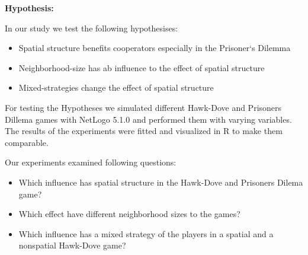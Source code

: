 \textbf{Hypothesis:}

In our study we test the following hypothesises: 

\begin{itemize}
\item Spatial structure benefits cooperators especially in the Prisoner`s Dilemma 
\item Neighborhood-size has ab influence to the effect of spatial structure
\item Mixed-strategies change the effect of spatial structure
\end{itemize}

For testing the Hypotheses we simulated different Hawk-Dove and Prisoners Dillema games with NetLogo 5.1.0 and performed them with varying variables. The results of the experiments were fitted and visualized in R to make them comparable. 

Our experiments examined following questions:
\begin{itemize}
\item Which influence has spatial structure in the Hawk-Dove and Prisoners Dilema game?
\item Which effect have different neighborhood sizes to the games?
\item Which influence has a mixed strategy of the players in a spatial and a nonspatial Hawk-Dove game?
\end{itemize}
